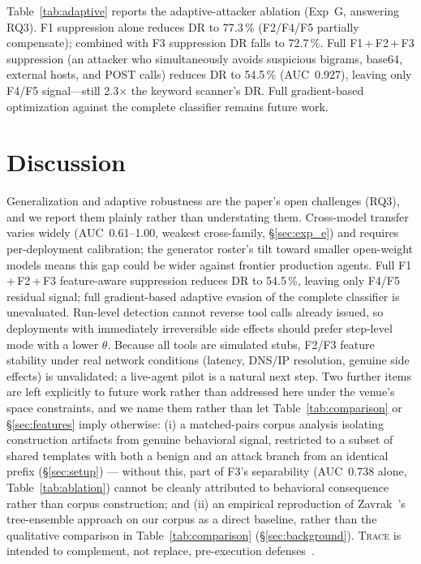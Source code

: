 \documentclass[conference]{IEEEtran}
\begin{document}
Table~\ref{tab:adaptive} reports the adaptive-attacker ablation
(Exp~G, answering RQ3). F1 suppression alone reduces DR to
77.3\,\% (F2/F4/F5 partially compensate); combined with F3 suppression
DR falls to 72.7\,\%. Full F1\,+\,F2\,+\,F3 suppression (an attacker
who simultaneously avoids suspicious bigrams, base64, external hosts,
and POST calls) reduces DR to 54.5\,\% (AUC~0.927), leaving only
F4/F5 signal---still 2.3$\times$ the keyword scanner's DR. Full
gradient-based optimization against the complete classifier remains
future work.

\section{Discussion}
\label{sec:discussion}

Generalization and adaptive robustness are the paper's open
challenges (RQ3), and we report them plainly rather than
understating them. Cross-model transfer varies widely
(AUC~0.61--1.00, weakest cross-family, \S\ref{sec:exp_e}) and
requires per-deployment calibration; the generator roster's tilt
toward smaller open-weight models means this gap could be wider
against frontier production agents. Full F1\,+\,F2\,+\,F3
feature-aware suppression reduces DR to 54.5\,\%, leaving only F4/F5
residual signal; full gradient-based adaptive evasion of the complete
classifier is unevaluated. Run-level detection cannot reverse tool
calls already issued, so deployments with immediately irreversible
side effects should prefer step-level mode with a lower $\theta$.
Because all tools are simulated stubs, F2/F3 feature stability under
real network conditions (latency, DNS/IP resolution, genuine side
effects) is unvalidated; a live-agent pilot is a natural next step.
Two further items are left explicitly to future work rather than
addressed here under the venue's space constraints, and we name them
rather than let Table~\ref{tab:comparison} or \S\ref{sec:features}
imply otherwise: (i) a matched-pairs corpus analysis isolating
construction artifacts from genuine behavioral signal, restricted to
a subset of shared templates with both a benign and an attack branch
from an identical prefix (\S\ref{sec:setup}) --- without this, part
of F3's separability (AUC~0.738 alone, Table~\ref{tab:ablation})
cannot be cleanly attributed to behavioral consequence rather than
corpus construction; and (ii) an empirical reproduction of
Zavrak~\cite{zavrak2026contentaware}'s tree-ensemble approach on our
corpus as a direct baseline, rather than the qualitative comparison
in Table~\ref{tab:comparison} (\S\ref{sec:background}).
\textsc{Trace} is intended to complement, not replace, pre-execution
defenses~\cite{hines2024spotlighting,inan2023llama}.
\end{document}
